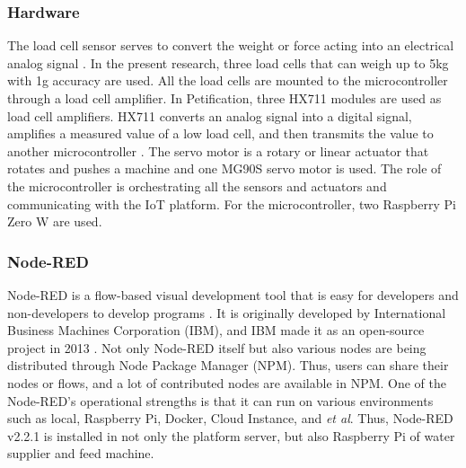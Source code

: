 \documentclass[conference]{IEEEtran}
\begin{document}
\subsubsection{Hardware}
The load cell sensor serves to convert the weight or force acting into an electrical analog signal \cite{b15}. In the present research, three load cells that can weigh up to 5kg with 1g accuracy are used.
All the load cells are mounted to the microcontroller through a load cell amplifier. In Petification, three HX711 modules are used as load cell amplifiers. HX711 converts an analog signal into a digital signal, amplifies a measured value of a low load cell, and then transmits the value to another microcontroller \cite{b16}. 
The servo motor is a rotary or linear actuator that rotates and pushes a machine \cite{b17} and one MG90S servo motor is used.
The role of the microcontroller is orchestrating all the sensors and actuators and communicating with the IoT platform. For the microcontroller, two Raspberry Pi Zero W are used.

\subsubsection{Node-RED}
Node-RED is a flow-based visual development tool that is easy for developers and non-developers to develop programs \cite{b18}.
It is originally developed by International Business Machines Corporation (IBM), and IBM made it as an open-source project in 2013 \cite{b18}. Not only Node-RED itself but also various nodes are being distributed through Node Package Manager (NPM). Thus, users can share their nodes or flows, and a lot of contributed nodes are available in NPM.
One of the Node-RED’s operational strengths is that it can run on various environments such as local, Raspberry Pi, Docker, Cloud Instance, and \textit{et al}. Thus, Node-RED v2.2.1 is installed in not only the platform server, but also Raspberry Pi of water supplier and feed machine.
\end{document}
